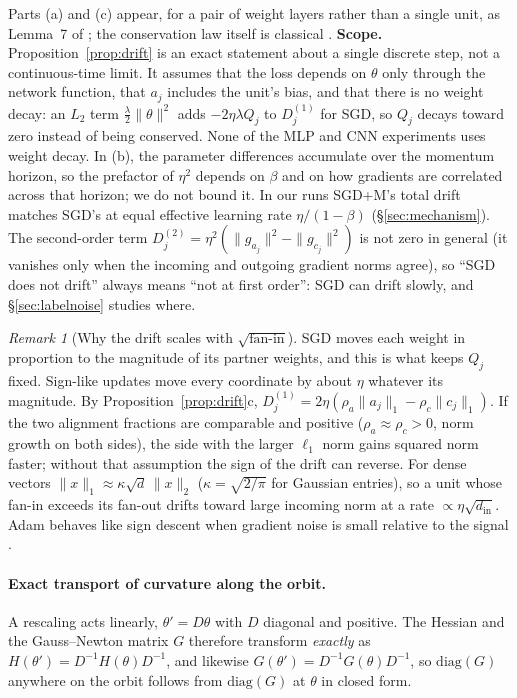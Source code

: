 \documentclass[10pt]{article}
\theoremstyle{remark}
\newtheorem{remark}{Remark}
\begin{document}
Parts (a) and (c) appear, for a pair of weight layers rather than a single unit, as Lemma~7 of \citet{shirodkar2026dead}; the conservation law itself is classical \citep{arora2018optimization,du2018algorithmic}. \textbf{Scope.} Proposition~\ref{prop:drift} is an exact statement about a single discrete step, not a continuous-time limit. It assumes that the loss depends on $\theta$ only through the network function, that $a_j$ includes the unit's bias, and that there is no weight decay: an $L_2$ term $\frac\lambda2\|\theta\|^2$ adds $-2\eta\lambda Q_j$ to $D^{(1)}_j$ for SGD, so $Q_j$ decays toward zero instead of being conserved. None of the MLP and CNN experiments uses weight decay. In (b), the parameter differences accumulate over the momentum horizon, so the prefactor of $\eta^2$ depends on $\beta$ and on how gradients are correlated across that horizon; we do not bound it. In our runs SGD+M's total drift matches SGD's at equal effective learning rate $\eta/(1-\beta)$ (\S\ref{sec:mechanism}). The second-order term $D^{(2)}_j=\eta^2(\|g_{a_j}\|^2-\|g_{c_j}\|^2)$ is not zero in general (it vanishes only when the incoming and outgoing gradient norms agree), so ``SGD does not drift'' always means ``not at first order'': SGD can drift slowly, and \S\ref{sec:labelnoise} studies where.

\begin{remark}[Why the drift scales with $\sqrt{\text{fan-in}}$]\label{rem:fanin}
SGD moves each weight in proportion to the magnitude of its partner weights, and this is what keeps $Q_j$ fixed. Sign-like updates move every coordinate by about $\eta$ whatever its magnitude. By Proposition~\ref{prop:drift}c, $D^{(1)}_j=2\eta(\rho_a\|a_j\|_1-\rho_c\|c_j\|_1)$. If the two alignment fractions are comparable and positive ($\rho_a\approx\rho_c>0$, norm growth on both sides), the side with the larger $\ell_1$ norm gains squared norm faster; without that assumption the sign of the drift can reverse. For dense vectors $\|x\|_1\approx\kappa\sqrt{d}\,\|x\|_2$ ($\kappa=\sqrt{2/\pi}$ for Gaussian entries), so a unit whose fan-in exceeds its fan-out drifts toward large incoming norm at a rate $\propto\eta\sqrt{d_{\mathrm{in}}}$. Adam behaves like sign descent when gradient noise is small relative to the signal \citep{balles2018dissecting,bernstein2018signsgd}.
\end{remark}

\paragraph{Exact transport of curvature along the orbit.} A rescaling acts linearly, $\theta'=D\theta$ with $D$ diagonal and positive. The Hessian and the Gauss--Newton matrix $G$ \citep{martens2020new} therefore transform \emph{exactly} as $H(\theta')=D^{-1}H(\theta)D^{-1}$, and likewise $G(\theta')=D^{-1}G(\theta)D^{-1}$, so $\mathrm{diag}(G)$ anywhere on the orbit follows from $\mathrm{diag}(G)$ at $\theta$ in closed form.
\end{document}
